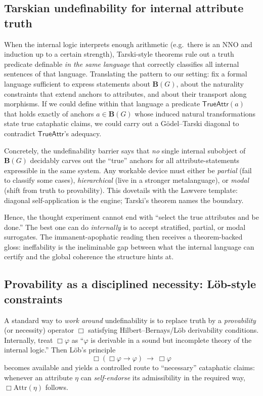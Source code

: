 \documentclass[11pt]{article}
\theoremstyle{upright}
\begin{document}
\subsection{Tarskian undefinability for internal attribute truth}
When the internal logic interprets enough arithmetic (e.g.\ there is an NNO and induction up to a certain strength), Tarski-style theorems \citep{Tarski1956} rule out a truth predicate definable \emph{in the same language} that correctly classifies all internal sentences of that language. Translating the pattern to our setting: fix a formal language sufficient to express statements about \(\mathbf B(G)\), about the naturality constraints that extend anchors to attributes, and about their transport along morphisms. If we could define within that language a predicate \(\mathsf{TrueAttr}(a)\) that holds exactly of anchors \(a\in\mathbf B(G)\) whose induced natural transformations state true cataphatic claims, we could carry out a Gödel–Tarski diagonal to contradict \(\mathsf{TrueAttr}\)’s adequacy. 

Concretely, the undefinability barrier says that \emph{no} single internal subobject of \(\mathbf B(G)\) decidably carves out the “true” anchors for all attribute-statements expressible in the same system. Any workable device must either be \emph{partial} (fail to classify some cases), \emph{hierarchical} (live in a stronger metalanguage), or \emph{modal} (shift from truth to provability). This dovetails with the Lawvere template: diagonal self-application is the engine; Tarski’s theorem names the boundary.

Hence, the thought experiment cannot end with “select the true attributes and be done.” The best one can do \emph{internally} is to accept stratified, partial, or modal surrogates. The immanent-apophatic reading then receives a theorem-backed gloss: ineffability is the ineliminable gap between what the internal language can certify and the global coherence the structure hints at.

\subsection{Provability as a disciplined necessity: Löb-style constraints}
A standard way to \emph{work around} undefinability is to replace truth by a \emph{provability} (or necessity) operator \(\Box\) satisfying Hilbert–Bernays/Löb derivability conditions. Internally, treat \(\Box \varphi\) as “\(\varphi\) is derivable in a sound but incomplete theory of the internal logic.” Then Löb’s principle \citep{Loeb1955}
\[
\Box(\Box \varphi \rightarrow \varphi) \ \rightarrow\ \Box \varphi
\]
becomes available and yields a controlled route to “necessary” cataphatic claims: whenever an attribute \(\eta\) can \emph{self-endorse} its admissibility in the required way, \(\Box \text{Attr}(\eta)\) follows.
\end{document}

